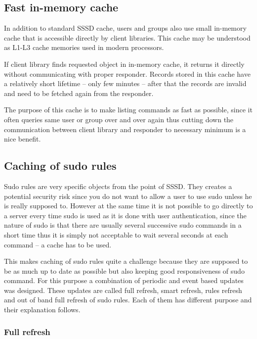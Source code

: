 \subsection{Fast in-memory cache}
\label{sssd:cache:memory}

In addition to standard SSSD cache, users and groups also use small in-memory
cache that is accessible directly by client libraries. This cache may be
understood as L1-L3 cache memories used in modern processors.

If client library finds requested object in in-memory cache, it returns it
directly without communicating with proper responder. Records stored in
this cache have a relatively short lifetime -- only few minutes -- after that
the records are invalid and need to be fetched again from the responder.

The purpose of this cache is to make listing commands as fast as possible,
since it often queries same user or group over and over again thus cutting down
the communication between client library and responder to necessary minimum is
a nice benefit.

\subsection{Caching of sudo rules}
\label{sssd:cache:sudo}

Sudo rules are very specific objects from the point of SSSD. They creates a
potential security risk since you do not want to allow a user to use sudo unless
he is really supposed to. However at the same time it is not possible to go
directly to a server every time sudo is used as it is done with user
authentication, since the nature of sudo is that there are usually several
successive sudo commands in a short time thus it is simply not acceptable to
wait several seconds at each command -- a cache has to be used.

This makes caching of sudo rules quite a challenge because they are supposed to
be as much up to date as possible but also keeping good responsiveness of sudo
command. For this purpose a combination of periodic and event based updates
was designed. These updates are called full refresh, smart refresh, rules
refresh and out of band full refresh of sudo rules. Each of them has different
purpose and their explanation follows.

\subsubsection{Full refresh}
\label{sssd:cache:sudo:full}

